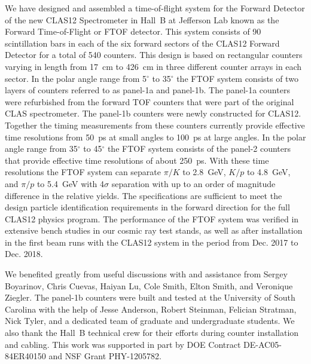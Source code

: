 \documentclass{elsart}
\begin{document}
We have designed and assembled a time-of-flight system for the Forward Detector of the new CLAS12
Spectrometer in Hall~B at Jefferson Lab known as the Forward Time-of-Flight or FTOF detector. This
system consists of 90 scintillation bars in each of the six forward sectors of the CLAS12 Forward Detector
for a total of 540 counters. This design is based on rectangular counters varying in length from 17~cm to
426~cm in three different counter arrays in each sector. In the polar angle range from 5$^\circ$ to
35$^\circ$ the FTOF system consists of two layers of counters referred to as panel-1a and panel-1b.
The panel-1a counters were refurbished from the forward TOF counters that were part of the original
CLAS spectrometer. The panel-1b counters were newly constructed for CLAS12. Together the timing
measurements from these counters currently provide effective time resolutions from 50~ps at small
angles to 100~ps at large angles. In the polar angle range from 35$^\circ$ to 45$^\circ$ the FTOF
system consists of the panel-2 counters that provide effective time resolutions of about 250~ps. With
these time resolutions the FTOF system can separate $\pi/K$ to 2.8~GeV, $K/p$ to 4.8~GeV, and $\pi/p$
to 5.4~GeV with 4$\sigma$ separation with up to an order of magnitude difference in the relative yields.
The specifications are sufficient to meet the design particle identification requirements in the forward
direction for the full CLAS12 physics program. The performance of the FTOF system was verified in
extensive bench studies in our cosmic ray test stands, as well as after installation in the first beam runs
with the CLAS12 system in the period from Dec. 2017 to Dec. 2018. 

\ack

We benefited greatly from useful discussions with and assistance from Sergey Boyarinov, Chris Cuevas,
Haiyan Lu, Cole Smith, Elton Smith, and Veronique Ziegler. The panel-1b counters were built and tested
at the University of South Carolina with the help of Jesse Anderson, Robert Steinman, Felician Stratman,
Nick Tyler, and a dedicated team of graduate and undergraduate students. We also thank the Hall~B technical
crew for their efforts during counter installation and cabling. This work was supported in part by DOE Contract
DE-AC05-84ER40150 and NSF Grant PHY-1205782.
\end{document}
